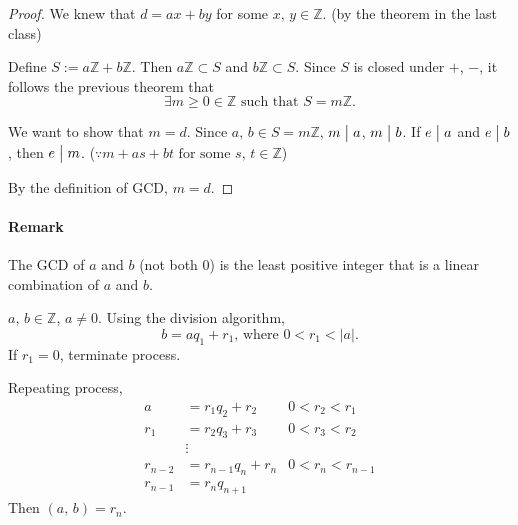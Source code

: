 \begin{proof}
    We knew that $d=ax+by$ for some $x,\,y \in \mathbb{Z}$. (by the theorem in the last class)

    Define $S := a\mathbb{Z} + b\mathbb{Z}$. Then $a\mathbb{Z} \subset S$ and $b\mathbb{Z} \subset S$.
    Since $S$ is closed under $+$, $-$, it follows the previous theorem that
    \[\exists m \geq 0 \in \mathbb{Z} \mbox{ such that } S = m\mathbb{Z}.\]

    We want to show that $m=d$. Since $a,\,b \in S = m\mathbb{Z}$, $m \bigm| a$, $m \bigm| b$.
    If $e \bigm| a$ and $e \bigm| b$, then $e \bigm| m$.
    ($\because m + as + bt \mbox{ for some } s,\,t \in \mathbb{Z}$)
    
    By the definition of GCD, $m=d$.
\end{proof}

\paragraph{Remark}
The GCD of $a$ and $b$ (not both 0)
is the least positive integer that is a linear combination of $a$ and $b$.

\begin{theorem}
    $a,\,b \in \mathbb{Z}$, $a \neq 0$.
    Using the division algorithm, \[b = aq_1 + r_1\mbox{, where }0<r_1<\left|a\right|.\]
    If $r_1 = 0$, terminate process.

    Repeating process,
    \begin{align*}
        a &= r_1q_2 + r_2 & 0<r_2<r_1 \\
        r_1 &= r_2q_3 + r_3 & 0<r_3<r_2 \\
        &\vdots \\
        r_{n-2} &= r_{n-1}q_n + r_n & 0<r_n<r_{n-1} \\
        r_{n-1} &= r_nq_{n+1}
    \end{align*}
    Then $\left(a,\,b\right)=r_n$.
\end{theorem}

